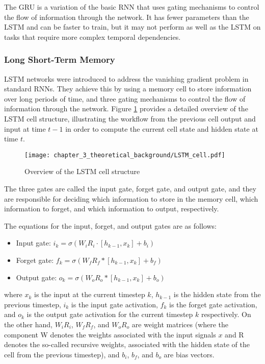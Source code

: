 The GRU is a variation of the basic RNN that uses gating mechanisms to control the flow of information through the network. It has fewer parameters than the LSTM and can be faster to train, but it may not perform as well as the LSTM on tasks that require more complex temporal dependencies.

\subsubsection{Long Short-Term Memory}
\label{subsubsec:3_LSTMs}

LSTM networks were introduced to address the vanishing gradient problem in standard \acp{RNN}. They achieve this by using a memory cell to store information over long periods of time, and three gating mechanisms to control the flow of information through the network. Figure \ref{fig:chapter_3_theoretical_background/LSTM} provides a detailed overview of the LSTM cell structure, illustrating the workflow from the previous cell output and input at time $t-1$ in order to compute the current cell state and hidden state at time $t$.

\begin{figure}[h]
	\centering
	\texttt{[image: chapter\_3\_theoretical\_background/LSTM\_cell.pdf]}
	\caption{Overview of the LSTM cell structure}
	\label{fig:chapter_3_theoretical_background/LSTM}
\end{figure}

The three gates are called the input gate, forget gate, and output gate, and they are responsible for deciding which information to store in the memory cell, which information to forget, and which information to output, respectively.

The equations for the input, forget, and output gates are as follows:

\begin{itemize}
	\item Input gate: $i_k = \sigma(W_i R_i \cdot [h_{k-1}, x_k] + b_i)$
	\item Forget gate: $f_k = \sigma(W_f R_f * [h_{k-1}, x_k] + b_f)$
	\item Output gate: $o_k = \sigma(W_o R_o * [h_{k-1}, x_k] + b_o)$
\end{itemize}

where $x_k$ is the input at the current timestep $k$, $h_{k-1}$ is the hidden state from the previous timestep, $i_k$ is the input gate activation, $f_k$ is the forget gate activation, and $o_k$ is the output gate activation for the current timestep $k$ respectively. On the other hand, $W_i R_i$, $W_f R_f$, and $W_o R_o$ are weight matrices (where the component W denotes the weights associated with the input signals $x$ and R denotes the so-called recursive weights, associated with the hidden state of the cell from the previous timestep), and $b_i$, $b_f$, and $b_o$ are bias vectors.

